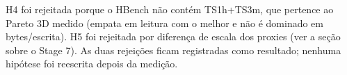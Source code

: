 H4 foi rejeitada porque o HBench não contém TS1h+TS3m, que pertence ao Pareto 3D medido (empata em leitura com o melhor e não é dominado em bytes/escrita). H5 foi rejeitada por diferença de escala dos proxies (ver a seção sobre o Stage 7). As duas rejeições ficam registradas como resultado; nenhuma hipótese foi reescrita depois da medição.
